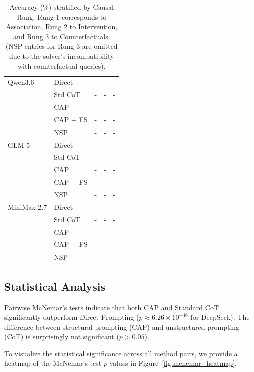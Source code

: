 \documentclass{article}
\theoremstyle{plain}
\theoremstyle{definition}
\theoremstyle{remark}
\begin{document}
\begin{table}[t]
\begin{minipage}[t]{0.45\textwidth}
\begin{footnotesize}
\begin{tabular}{llccc}
        \midrule
        Qwen3.6 & Direct & - & - & - \\
         & Std CoT & - & - & - \\
         & CAP & - & - & - \\
         & CAP + FS & - & - & - \\
         & NSP & - & - & - \\
        \midrule
        GLM-5 & Direct & - & - & - \\
         & Std CoT & - & - & - \\
         & CAP & - & - & - \\
         & CAP + FS & - & - & - \\
         & NSP & - & - & - \\
        \midrule
        MiniMax-2.7 & Direct & - & - & - \\
         & Std CoT & - & - & - \\
         & CAP & - & - & - \\
         & CAP + FS & - & - & - \\
         & NSP & - & - & - \\
        \bottomrule
      \end{tabular}

      \vskip 0.1in

      \caption{Accuracy (\%) stratified by Causal Rung. Rung 1 corresponds to Association, Rung 2 to Intervention, and Rung 3 to Counterfactuals. (NSP entries for Rung 3 are omitted due to the solver's incompatibility with counterfactual queries).}
      \label{tab:rung_results}
      \end{footnotesize}
  \end{minipage}
  
  \vskip -0.1in %
\end{table}

\subsection{Statistical Analysis}

Pairwise McNemar's tests indicate that both CAP and Standard CoT significantly outperform Direct Prompting ($p \approx 6.26 \times 10^{-46}$ for DeepSeek). The difference between structural prompting (CAP) and unstructured prompting (CoT) is surprisingly not significant ($p>0.05$).

To visualize the statistical significance across all method pairs, we provide a heatmap of the McNemar's test $p$-values in Figure~\ref{fig:mcnemar_heatmap}.
\end{document}
